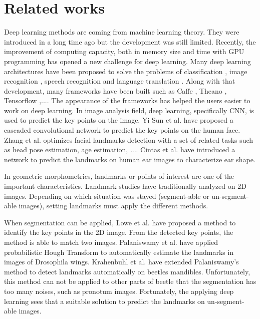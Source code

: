 \documentclass[10pt]{article}
\begin{document}
\section{Related works}
Deep learning methods are coming from machine learning theory. They were introduced in a long time ago but the development was still limited. Recently, the improvement of computing capacity, both in memory size and time with GPU programming has opened a new challenge for deep learning. Many deep learning architectures have been proposed to solve the problems of classification \cite{krizhevsky2012imagenet, ciregan2012multi}, image recognition \cite{szegedy2015going, farabet2013learning, li2015convolutional}, speech recognition \cite{mikolov2011strategies, hinton2012deep} and language translation \cite{jean2014using, sutskever2014sequence}. Along with that development, many frameworks have been built such as Caffe \cite{jia2014caffe}, Theano \cite{2016arXiv160502688short}, Tensorflow \cite{tensorflow2015},.... The appearance of the frameworks has helped the users easier to work on deep learning. In image analysis field, deep learning, specifically CNN, is used to predict the key points on the image. Yi Sun et al. \cite{sun2013deep} have proposed a cascaded convolutional network to predict the key points on the human face. Zhang et al. \cite{zhang2014facial} optimizes facial landmarks detection with a set of related tasks such as head pose estimation, age estimation, .... Cintas et al. \cite{cintas2016automatic} have introduced a network to predict the landmarks on human ear images to characterize ear shape. 



In geometric morphometrics, landmarks or points of interest are one of the important characteristics. Landmark studies have traditionally analyzed on 2D images. Depending on which situation was stayed (segment-able or un-segment-able images), setting landmarks must apply the different methods.

When segmentation can be applied, Lowe et al. \cite{lowe2004distinctive} have proposed a method to identify the key points in the 2D image. From the detected key points, the method is able to match two images. Palaniswamy et al. \cite{palaniswamy2010automatic} have applied probabilistic Hough Transform to automatically estimate the landmarks in images of Drosophila wings. Krahenbuhl et al. \cite{le2017maelab} have extended Palaniswamy's method to detect landmarks automatically on beetles mandibles. Unfortunately, this method can not be applied to other parts of beetle that the segmentation has too many noises, such as pronotum images. Fortunately, the applying deep learning sees that a suitable solution to predict the landmarks on un-segment-able images.
\end{document}

